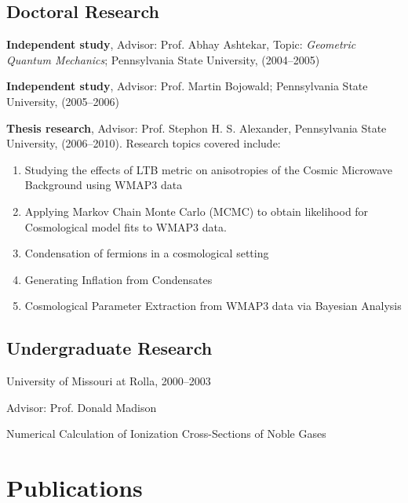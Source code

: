\documentclass[letterpaper]{article}
\renewenvironment{itemize}{
  \begin{list}{}{
    \setlength{\leftmargin}{1.5em}
  }
}{
  \end{list}
}
\begin{document}
\subsection*{Doctoral Research}
\begin{itemize}
\item \textbf{Independent study}, Advisor: Prof. Abhay Ashtekar, Topic: \emph{Geometric Quantum Mechanics}; Pennsylvania State University, (2004--2005)
\item \textbf{Independent study}, Advisor: Prof. Martin Bojowald; Pennsylvania State University, (2005--2006)
\item \textbf{Thesis research}, Advisor: Prof. Stephon H. S. Alexander, Pennsylvania State University, (2006--2010). Research topics covered include:
\begin{enumerate}
\item Studying the effects of LTB metric on anisotropies of the Cosmic Microwave Background using WMAP3 data
\item Applying Markov Chain Monte Carlo (MCMC) to obtain likelihood for Cosmological model fits to WMAP3 data.
\item Condensation of fermions in a cosmological setting
\item Generating Inflation from Condensates
\item Cosmological Parameter Extraction from WMAP3 data via Bayesian Analysis 
\end{enumerate}
\end{itemize}

\subsection*{Undergraduate Research}
\begin{itemize}
\item University of Missouri at Rolla, 2000--2003
\item Advisor: Prof. Donald Madison
\item Numerical Calculation of Ionization Cross-Sections of Noble Gases 
\end{itemize}

\section*{Publications}
\end{document}
